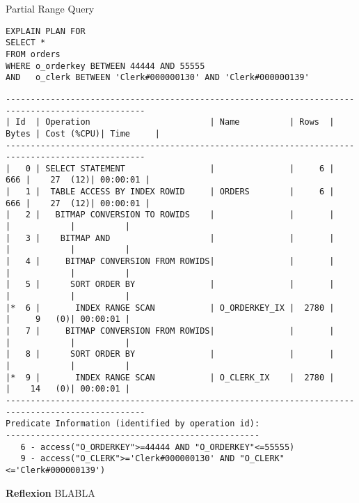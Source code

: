 \documentclass[10pt]{article}
\begin{document}
Partial Range Query
\begin{lstlisting}[style=sql]
EXPLAIN PLAN FOR
SELECT *
FROM orders
WHERE o_orderkey BETWEEN 44444 AND 55555
AND   o_clerk BETWEEN 'Clerk#000000130' AND 'Clerk#000000139'
\end{lstlisting}
\begin{lstlisting}[style=queryexecutionplan]
--------------------------------------------------------------------------------------------------
| Id  | Operation                        | Name          | Rows  | Bytes | Cost (%CPU)| Time     |
--------------------------------------------------------------------------------------------------
|   0 | SELECT STATEMENT                 |               |     6 |   666 |    27  (12)| 00:00:01 |
|   1 |  TABLE ACCESS BY INDEX ROWID     | ORDERS        |     6 |   666 |    27  (12)| 00:00:01 |
|   2 |   BITMAP CONVERSION TO ROWIDS    |               |       |       |            |          |
|   3 |    BITMAP AND                    |               |       |       |            |          |
|   4 |     BITMAP CONVERSION FROM ROWIDS|               |       |       |            |          |
|   5 |      SORT ORDER BY               |               |       |       |            |          |
|*  6 |       INDEX RANGE SCAN           | O_ORDERKEY_IX |  2780 |       |     9   (0)| 00:00:01 |
|   7 |     BITMAP CONVERSION FROM ROWIDS|               |       |       |            |          |
|   8 |      SORT ORDER BY               |               |       |       |            |          |
|*  9 |       INDEX RANGE SCAN           | O_CLERK_IX    |  2780 |       |    14   (0)| 00:00:01 |
--------------------------------------------------------------------------------------------------
Predicate Information (identified by operation id):
---------------------------------------------------
   6 - access("O_ORDERKEY">=44444 AND "O_ORDERKEY"<=55555)
   9 - access("O_CLERK">='Clerk#000000130' AND "O_CLERK"<='Clerk#000000139')
\end{lstlisting}
\textbf{Reflexion} \newline
BLABLA
\end{document}
